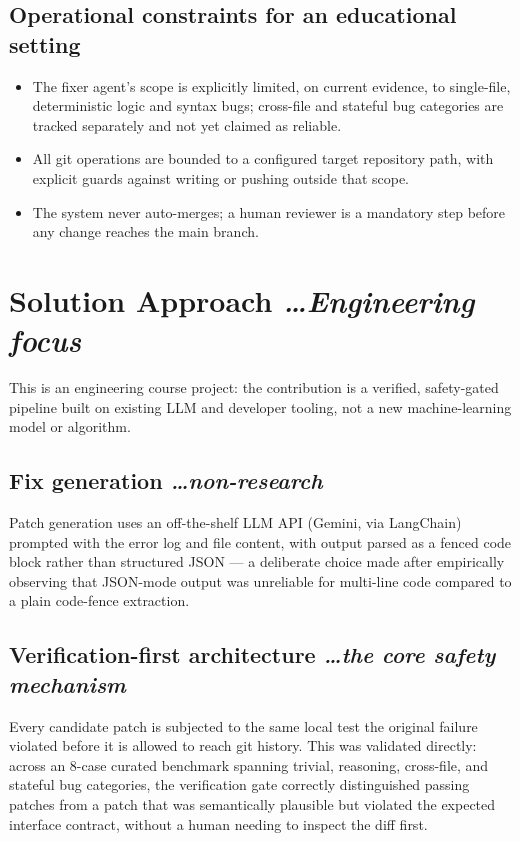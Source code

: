 \documentclass[11pt,a4paper]{article}
\newcommand{\BvrHint}[1]{%
  {\normalfont\normalsize\itshape\hfill #1}}
\begin{document}
\subsection{Operational constraints for an educational setting}
\begin{itemize}[leftmargin=0.7cm]
    \item The fixer agent's scope is explicitly limited, on current
      evidence, to single-file, deterministic logic and syntax
      bugs; cross-file and stateful bug categories are tracked
      separately and not yet claimed as reliable.
    \item All git operations are bounded to a configured target
      repository path, with explicit guards against writing or
      pushing outside that scope.
    \item The system never auto-merges; a human reviewer is a
      mandatory step before any change reaches the main branch.
\end{itemize}

\section{Solution Approach %
\BvrHint{\ldots Engineering focus}}
This is an engineering course project: the contribution is a
verified, safety-gated pipeline built on existing LLM and developer
tooling, not a new machine-learning model or algorithm.

\subsection{Fix generation %
\BvrHint{\ldots non-research}}
Patch generation uses an off-the-shelf LLM API (Gemini, via
LangChain) prompted with the error log and file content, with output
parsed as a fenced code block rather than structured JSON --- a
deliberate choice made after empirically observing that JSON-mode
output was unreliable for multi-line code compared to a plain
code-fence extraction.

\subsection{Verification-first architecture %
\BvrHint{\ldots the core safety mechanism}}
Every candidate patch is subjected to the same local test the
original failure violated before it is allowed to reach git history.
This was validated directly: across an 8-case curated benchmark
spanning trivial, reasoning, cross-file, and stateful bug
categories, the verification gate correctly distinguished passing
patches from a patch that was semantically plausible but violated
the expected interface contract, without a human needing to inspect
the diff first.
\end{document}

